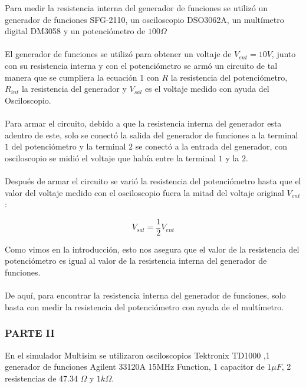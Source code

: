 \documentclass[DIV=calc, paper=a4, fontsize=11pt]{scrartcl}
\begin{document}
\begin{multicols}{2}
Para medir la resistencia interna del generador de funciones se utilizó un generador de funciones SFG-2110, un osciloscopio DSO3062A, un multímetro digital DM3058 y un potenciómetro de $100\Omega$
\\\\
El generador de funciones se utilizó para obtener un voltaje de $V_{ent}=10 V$, junto con su resistencia interna y con el potenciómetro se armó un circuito de tal manera que se cumpliera la ecuación 1 con $R$ la resistencia del potenciómetro, $R_{int}$ la resistencia del generador y $V_{sal}$ es el voltaje medido con ayuda del Osciloscopio.
\\\\
Para armar el circuito, debido a que la resistencia interna del generador esta adentro de este, solo se conectó la salida del generador de funciones a la terminal $1$ del potenciómetro y la terminal $2$ se conectó a la entrada del generador, con osciloscopio se midió el voltaje que había entre la terminal $1$ y la $2$.
\\\\
Después de armar el circuito se varió la resistencia del potenciómetro hasta que el valor del voltaje medido con el osciloscopio fuera la mitad del voltaje original $V_{ent}$:

\begin{equation*}
  V_{sal}=\frac{1}{2}V_{ent}  
\end{equation*}

Como vimos en la introducción, esto nos asegura que el valor de la resistencia del potenciómetro es igual al valor de la resistencia interna del generador de funciones.
\\\\
De aquí, para encontrar la resistencia interna del generador de funciones, solo basta con medir la resistencia del potenciómetro con ayuda de el multímetro.


\subsubsection*{PARTE II}

En el simulador Multisim se utilizaron osciloscopios Tektronix TD1000 ,1 generador de funciones Agilent 33120A 15MHz Function, 1 capacitor de $1 \mu F$, 2 resistencias de 47.34 $\Omega$ y $1k \Omega$. 




\end{multicols}
\end{document}
